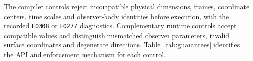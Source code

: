 The \StaticControlCount{} compiler controls reject incompatible physical dimensions, frames,
coordinate centers, time scales and observer-body identities before execution, with the recorded
\texttt{E0308} or \texttt{E0277} diagnostics. Complementary runtime controls accept compatible
values and distinguish mismatched observer parameters, invalid surface coordinates and degenerate
directions. Table~\ref{tab:guarantees} identifies the API and enforcement mechanism for each
control.

\FloatBarrier{}
